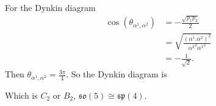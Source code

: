 \documentclass[main.tex]{subfiles}
\begin{document}
For the Dynkin diagram
\begin{align}
\cos{(\theta_{\alpha^1,\alpha^2})}&=-\frac{\sqrt{p_1p_2}}{2}\\
&=\sqrt{\frac{(\alpha^1.\alpha^2)^2}{{\alpha^2}^2{\alpha^1}^2}}\\
&=-\frac{1}{\sqrt{2}}.
\end{align}
Then $\theta_{\alpha^1,\alpha^2}=\frac{3\pi}{4}$. So the Dynkin diagram is
\begin{figure}[H] 
\centering
\end{figure}
Which is $C_2$ or $B_2$, $\mathfrak{so}(5)\cong\mathfrak{sp}(4)$.
\end{document}
